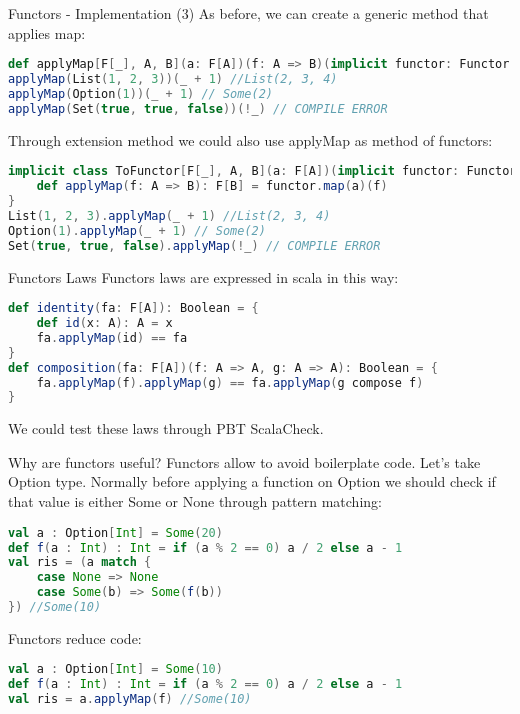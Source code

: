 \begin{frame}[fragile]{Functors - Implementation (3)}			
	As before, we can create a generic method that applies map:
\begin{lstlisting}[language=scala]
def applyMap[F[_], A, B](a: F[A])(f: A => B)(implicit functor: Functor[F]): F[B] = functor.map(a)(f)
applyMap(List(1, 2, 3))(_ + 1) //List(2, 3, 4)
applyMap(Option(1))(_ + 1) // Some(2)
applyMap(Set(true, true, false))(!_) // COMPILE ERROR
\end{lstlisting}	
	Through extension method we could also use applyMap as method of functors:
\begin{lstlisting}[language=scala]
implicit class ToFunctor[F[_], A, B](a: F[A])(implicit functor: Functor[F]) {
	def applyMap(f: A => B): F[B] = functor.map(a)(f)
}
List(1, 2, 3).applyMap(_ + 1) //List(2, 3, 4)
Option(1).applyMap(_ + 1) // Some(2)
Set(true, true, false).applyMap(!_) // COMPILE ERROR
\end{lstlisting}	
\end{frame}

\begin{frame}[fragile]{Functors Laws}
	Functors laws are expressed in scala in this way:
\begin{lstlisting}[language=scala]
def identity(fa: F[A]): Boolean = {
	def id(x: A): A = x	
	fa.applyMap(id) == fa
}
def composition(fa: F[A])(f: A => A, g: A => A): Boolean = {
	fa.applyMap(f).applyMap(g) == fa.applyMap(g compose f)
}
\end{lstlisting}	
	We could test these laws through PBT ScalaCheck.
\end{frame}

\begin{frame}[fragile]{Why are functors useful?}
	Functors allow to avoid boilerplate code.
	Let's take Option type. 
	Normally before applying a function on Option we should check if that value is either Some or None through pattern matching:
\begin{lstlisting}[language=scala]
val a : Option[Int] = Some(20)
def f(a : Int) : Int = if (a % 2 == 0) a / 2 else a - 1
val ris = (a match {
	case None => None
	case Some(b) => Some(f(b))
}) //Some(10)
\end{lstlisting}	
	
	Functors reduce code:
\begin{lstlisting}[language=scala]
val a : Option[Int] = Some(10)
def f(a : Int) : Int = if (a % 2 == 0) a / 2 else a - 1
val ris = a.applyMap(f) //Some(10)
\end{lstlisting}
\end{frame}